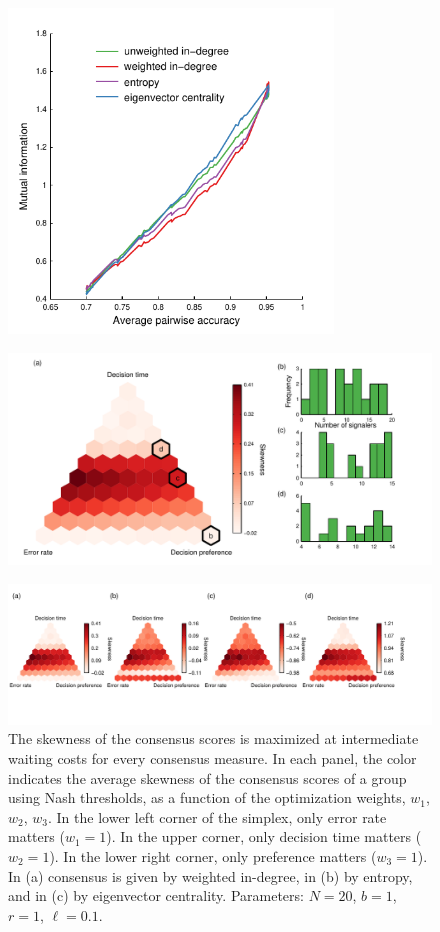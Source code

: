\documentclass{article}
\begin{document}
\begin{figure}[ht]
\includegraphics[width=3.4in]{mutinfo_vs_accuracy.pdf}
\caption{ }
\end{figure}

\begin{figure}[ht]
\includegraphics[width=6.83in]{skewness_histograms.pdf}
\caption{ }
\end{figure}

\begin{figure}[ht]
\includegraphics[width=6.83in]{multi_skewness.pdf}
\caption{\label{supp_skewness} The skewness of the consensus scores is maximized at intermediate waiting costs for every consensus measure. In each panel, the color indicates the average skewness of the consensus scores of a group using Nash thresholds, as a function of the optimization weights, $w_1$, $w_2$, $w_3$. In the lower left corner of the simplex, only error rate matters ($w_1=1$).  In the upper corner, only decision time matters ($w_2=1$).  In the lower right corner, only preference matters ($w_3=1$). In (a) consensus is given by weighted in-degree, in (b) by entropy, and in (c) by eigenvector centrality. Parameters: $N=20$, $b=1$, $r=1$, $\ell=0.1$.} 
\end{figure}


\pagebreak
\nocite{*}


\end{document}
